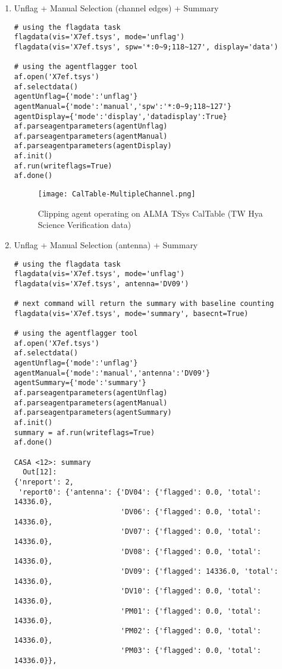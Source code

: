 \begin{enumerate}
\item Unflag + Manual Selection (channel edges) + Summary
\begin{verbatim}
# using the flagdata task
flagdata(vis='X7ef.tsys', mode='unflag')
flagdata(vis='X7ef.tsys', spw='*:0~9;118~127', display='data')

# using the agentflagger tool
af.open('X7ef.tsys')
af.selectdata()
agentUnflag={'mode':'unflag'}
agentManual={'mode':'manual','spw':'*:0~9;118~127'}
agentDisplay={'mode':'display','datadisplay':True}
af.parseagentparameters(agentUnflag)
af.parseagentparameters(agentManual)
af.parseagentparameters(agentDisplay)
af.init()
af.run(writeflags=True)
af.done() 

\end{verbatim}

\begin{figure}
\texttt{[image: CalTable-MultipleChannel.png]}
\caption{Clipping agent operating on ALMA TSys CalTable (TW Hya Science
Verification data)}
\label{Fig:TW Hya CalTable Clip}
\end{figure}

\item Unflag + Manual Selection (antenna) + Summary
\begin{verbatim}
# using the flagdata task
flagdata(vis='X7ef.tsys', mode='unflag')
flagdata(vis='X7ef.tsys', antenna='DV09')

# next command will return the summary with baseline counting
flagdata(vis='X7ef.tsys', mode='summary', basecnt=True)

# using the agentflagger tool
af.open('X7ef.tsys')
af.selectdata()
agentUnflag={'mode':'unflag'}
agentManual={'mode':'manual','antenna':'DV09'}
agentSummary={'mode':'summary'}
af.parseagentparameters(agentUnflag)
af.parseagentparameters(agentManual)
af.parseagentparameters(agentSummary)
af.init()
summary = af.run(writeflags=True)
af.done() 

CASA <12>: summary
  Out[12]: 
{'nreport': 2,
 'report0': {'antenna': {'DV04': {'flagged': 0.0, 'total': 14336.0},
                         'DV06': {'flagged': 0.0, 'total': 14336.0},
                         'DV07': {'flagged': 0.0, 'total': 14336.0},
                         'DV08': {'flagged': 0.0, 'total': 14336.0},
                         'DV09': {'flagged': 14336.0, 'total': 14336.0},
                         'DV10': {'flagged': 0.0, 'total': 14336.0},
                         'PM01': {'flagged': 0.0, 'total': 14336.0},
                         'PM02': {'flagged': 0.0, 'total': 14336.0},
                         'PM03': {'flagged': 0.0, 'total': 14336.0}},


\end{verbatim}

\end{enumerate}


